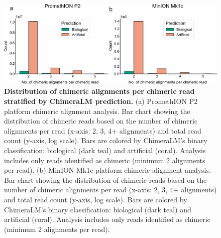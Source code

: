 \documentclass[pdflatex,sn-nature]{sn-jnl}%
\theoremstyle{thmstyleone}%
\theoremstyle{thmstyletwo}%
\theoremstyle{thmstylethree}%
\begin{document}
\begin{figure}[!ht]
	\begin{center}
		\includegraphics[width=\textwidth]{final_figures/sf2}
	\end{center}
	\caption{{\bf Distribution of chimeric alignments per chimeric read stratified by ChimeraLM prediction.}
		(a) PromethION P2 platform chimeric alignment analysis. Bar chart showing the distribution of chimeric reads based on the number of chimeric alignments per read (x-axis: 2, 3, 4+ alignments) and total read count (y-axis, log scale). Bars are colored by ChimeraLM's binary classification: biological (dark teal) and artificial (coral). Analysis includes only reads identified as chimeric (minimum 2 alignments per read).
		(b) MinION Mk1c platform chimeric alignment analysis. Bar chart showing the distribution of chimeric reads based on the number of chimeric alignments per read (x-axis: 2, 3, 4+ alignments) and total read count (y-axis, log scale). Bars are colored by ChimeraLM's binary classification: biological (dark teal) and artificial (coral). Analysis includes only reads identified as chimeric (minimum 2 alignments per read).}\label{fig:sf2}
\end{figure}
\end{document}
